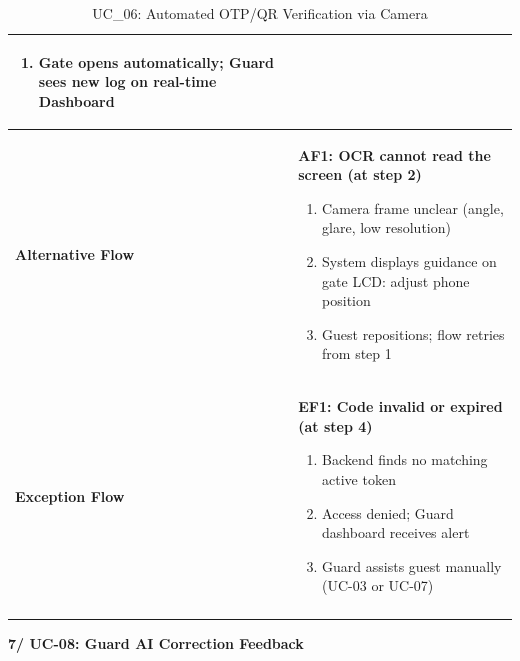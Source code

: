 \documentclass[a4paper]{article}
\newlength{\ucLeft}
\begin{document}
\begin{longtable}{|>{\bfseries}p{\ucLeft}|
                p{\dimexpr\textwidth-\ucLeft-4\tabcolsep-3\arrayrulewidth\relax}|}
\begin{enumerate}[leftmargin=*, nosep, topsep=0pt, partopsep=0pt, parsep=0pt]
    \item Gate opens automatically; Guard sees new log on real-time Dashboard
\end{enumerate}
\\ \hline
Alternative Flow &
\noindent \textbf{AF1: OCR cannot read the screen (at step 2)}
\begin{enumerate}
    \item Camera frame unclear (angle, glare, low resolution)
    \item System displays guidance on gate LCD: adjust phone position
    \item Guest repositions; flow retries from step 1
\end{enumerate}
\\ \hline
Exception Flow &
\noindent \textbf{EF1: Code invalid or expired (at step 4)}
\begin{enumerate}
    \item Backend finds no matching active token
    \item Access denied; Guard dashboard receives alert
    \item Guard assists guest manually (UC-03 or UC-07)
\end{enumerate}
\\ \hline
\caption{UC\_06: Automated OTP/QR Verification via Camera}\label{tab:uc06}
\end{longtable}

\newpage
\noindent \textbf{7/ UC-08: Guard AI Correction Feedback}
\setlength{\tabcolsep}{6pt}
\renewcommand{\arraystretch}{1.2}
\setlength{\ucLeft}{30mm}
\end{document}
